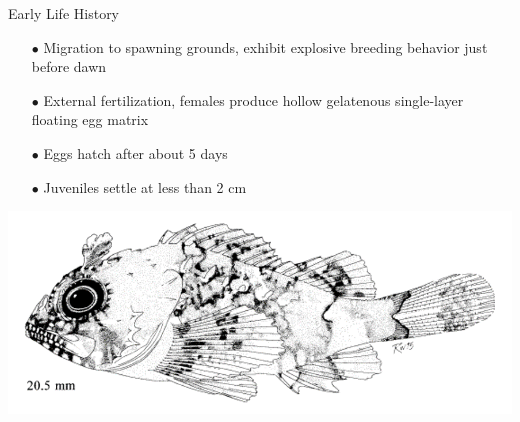 \documentclass[ignorenonframetext,]{beamer}
\begin{document}
\begin{frame}{Early Life History}

\begin{itemize} 
\item[$\bullet$] Migration to spawning grounds, exhibit explosive breeding behavior just before dawn
\item[$\bullet$] External fertilization, females produce hollow gelatenous single-layer floating egg matrix
\item[$\bullet$] Eggs hatch after about 5 days
\item[$\bullet$] Juveniles settle at less than 2 cm 
\end{itemize}

\centering
\includegraphics[width=.5\textwidth]{Figures/baby_scorp}


\end{frame}
\end{document}
